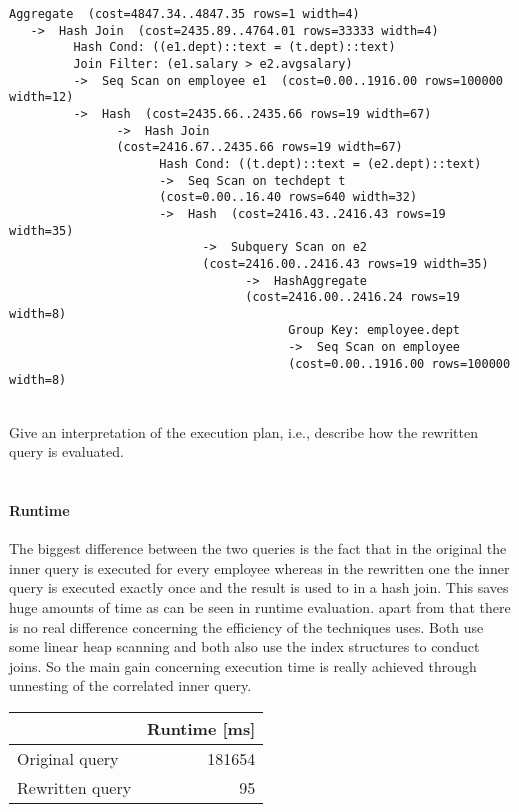 \documentclass[11pt]{scrartcl}
\begin{document}
\begin{verbatim}
Aggregate  (cost=4847.34..4847.35 rows=1 width=4)
   ->  Hash Join  (cost=2435.89..4764.01 rows=33333 width=4)
         Hash Cond: ((e1.dept)::text = (t.dept)::text)
         Join Filter: (e1.salary > e2.avgsalary)
         ->  Seq Scan on employee e1  (cost=0.00..1916.00 rows=100000 width=12)
         ->  Hash  (cost=2435.66..2435.66 rows=19 width=67)
               ->  Hash Join 
               (cost=2416.67..2435.66 rows=19 width=67)
                     Hash Cond: ((t.dept)::text = (e2.dept)::text)
                     ->  Seq Scan on techdept t  
                     (cost=0.00..16.40 rows=640 width=32)
                     ->  Hash  (cost=2416.43..2416.43 rows=19 width=35)
                           ->  Subquery Scan on e2  
                           (cost=2416.00..2416.43 rows=19 width=35)
                                 ->  HashAggregate  
                                 (cost=2416.00..2416.24 rows=19 width=8)
                                       Group Key: employee.dept
                                       ->  Seq Scan on employee  
                                       (cost=0.00..1916.00 rows=100000 width=8)
\end{verbatim}
\ \\
Give an interpretation of the execution plan, i.e., describe how the
rewritten query is evaluated.
\\ \\
\paragraph{Runtime}
The biggest difference between the two queries is the fact that in the original the inner query is executed for every employee whereas in the rewritten one the inner query is executed exactly once and the result is used to in a hash join. This saves huge amounts of time as can be seen in runtime evaluation. apart from that there is no real difference concerning the efficiency of the techniques uses. Both use some linear heap scanning and both also use the index structures to conduct joins. So the main gain concerning execution time is really achieved through unnesting of the correlated inner query.



\begin{table}[H]
  \begin{tabular}{l|r}
    & Runtime [ms] \\
   \hline
    Original query & 181654 \\
    Rewritten query & 95 \\
  \end{tabular}
\end{table}
\end{document}

